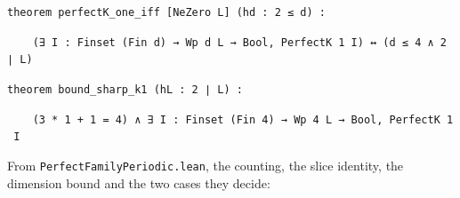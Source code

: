 \documentclass[11pt,a4paper]{article}
\theoremstyle{named}
\begin{document}
\begin{leancode}
\item \texttt{theorem\ \allowbreak{}perfectK\_\allowbreak{}one\_\allowbreak{}iff\ \allowbreak{}[NeZero\ \allowbreak{}L]\ \allowbreak{}(hd\ \allowbreak{}:\ \allowbreak{}2\ \allowbreak{}≤\ \allowbreak{}d)\ \allowbreak{}:}
\item \texttt{\ \allowbreak{}\ \allowbreak{}\ \allowbreak{}\ \allowbreak{}(∃\ \allowbreak{}I\ \allowbreak{}:\ \allowbreak{}Finset\ \allowbreak{}(Fin\ \allowbreak{}d)\ \allowbreak{}→\ \allowbreak{}Wp\ \allowbreak{}d\ \allowbreak{}L\ \allowbreak{}→\ \allowbreak{}Bool,\ \allowbreak{}PerfectK\ \allowbreak{}1\ \allowbreak{}I)\ \allowbreak{}↔\ \allowbreak{}(d\ \allowbreak{}≤\ \allowbreak{}4\ \allowbreak{}∧\ \allowbreak{}2\ \allowbreak{}∣\ \allowbreak{}L)}
\smallskip
\item \texttt{theorem\ \allowbreak{}bound\_\allowbreak{}sharp\_\allowbreak{}k1\ \allowbreak{}(hL\ \allowbreak{}:\ \allowbreak{}2\ \allowbreak{}∣\ \allowbreak{}L)\ \allowbreak{}:}
\item \texttt{\ \allowbreak{}\ \allowbreak{}\ \allowbreak{}\ \allowbreak{}(3\ \allowbreak{}*\ \allowbreak{}1\ \allowbreak{}+\ \allowbreak{}1\ \allowbreak{}=\ \allowbreak{}4)\ \allowbreak{}∧\ \allowbreak{}∃\ \allowbreak{}I\ \allowbreak{}:\ \allowbreak{}Finset\ \allowbreak{}(Fin\ \allowbreak{}4)\ \allowbreak{}→\ \allowbreak{}Wp\ \allowbreak{}4\ \allowbreak{}L\ \allowbreak{}→\ \allowbreak{}Bool,\ \allowbreak{}PerfectK\ \allowbreak{}1\ \allowbreak{}I}
\end{leancode}
From \texttt{PerfectFamilyPeriodic.\allowbreak{}lean}, the counting, the slice identity, the dimension bound and the two cases they decide:
\end{document}
